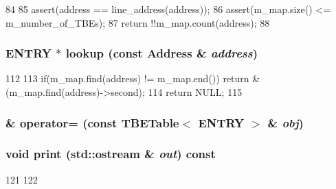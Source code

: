 \begin{DoxyCode}
84 {
85     assert(address == line_address(address));
86     assert(m_map.size() <= m_number_of_TBEs);
87     return !!m_map.count(address);
88 }
\end{DoxyCode}
\hypertarget{classTBETable_a44b3e7d7c435b9326d2de61d2d65af2e}{
\subsubsection[{lookup}]{\setlength{\rightskip}{0pt plus 5cm}ENTRY $\ast$ lookup (const {\bf Address} \& {\em address})}}
\label{classTBETable_a44b3e7d7c435b9326d2de61d2d65af2e}



\begin{DoxyCode}
112 {
113   if(m_map.find(address) != m_map.end()) return &(m_map.find(address)->second);
114   return NULL;
115 }
\end{DoxyCode}
\hypertarget{classTBETable_a6dac37cd05bf0d7230bf69307dee9abf}{
\subsubsection[{operator=}]{\& operator= (const {\bf TBETable}$<$ ENTRY $>$ \& {\em obj})}}
\label{classTBETable_a6dac37cd05bf0d7230bf69307dee9abf}
\hypertarget{classTBETable_ac55fe386a101fbae38c716067c9966a0}{
\subsubsection[{print}]{\setlength{\rightskip}{0pt plus 5cm}void print (std::ostream \& {\em out}) const}}
\label{classTBETable_ac55fe386a101fbae38c716067c9966a0}



\begin{DoxyCode}
121 {
122 }
\end{DoxyCode}


